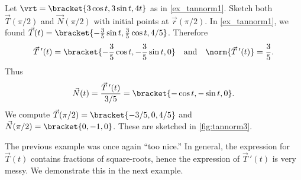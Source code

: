 \begin{example}\label{ex_tannorm3}%
Let $\vrt =\bracket{3\cos t, 3\sin t, 4t}$ as in \autoref{ex_tannorm1}. Sketch both $\vec T(\pi/2)$ and $\vec N(\pi/2)$ with initial points at $\vec r(\pi/2)$.
\solution
In \autoref{ex_tannorm1}, we found $\vec T(t)=\bracket{-\frac35\sin t,\frac35\cos t,4/5}$. Therefore 
\[\vec T\,'(t) =\bracket{-\frac35\cos t,-\frac35\sin t,0}\quad \text{and} \quad \norm{\vec T\,'(t)} = \frac35.\]
%
%
%
Thus
\[\vec N(t) = \frac{\vec T\,'(t)}{3/5} =\bracket{-\cos t,-\sin t,0}.\]
We compute $\vec T(\pi/2) =\bracket{-3/5,0,4/5}$ and $\vec N(\pi/2) =\bracket{0,-1,0}$. These are sketched in \autoref{fig:tannorm3}.
\end{example}

The previous example was once again ``too nice.'' In general, the expression for $\vec T(t)$ contains fractions of square-roots, hence the expression of $\vec T\,'(t)$ is very messy. We demonstrate this in the next example.

